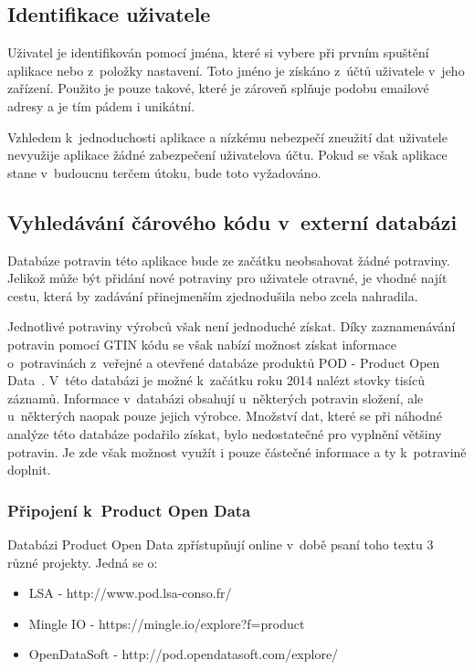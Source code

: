 \documentclass[thesis=B,czech]{FITthesis}[2013/10/20]
\begin{document}
\clearpage

\subsection{Identifikace uživatele}

Uživatel je identifikován pomocí jména, které si vybere při prvním spuštění aplikace nebo z~položky nastavení. Toto jméno je získáno z~účtů uživatele v~jeho zařízení. Použito je pouze takové, které je zároveň splňuje podobu emailové adresy a je tím pádem i unikátní.

Vzhledem k~jednoduchosti aplikace a nízkému nebezpečí zneužití dat uživatele nevyužije aplikace žádné zabezpečení uživatelova účtu. Pokud se však aplikace stane v~budoucnu terčem útoku, bude toto vyžadováno.

\subsection{Vyhledávání čárového kódu v~externí databázi}

Databáze potravin této aplikace bude ze začátku neobsahovat žádné potraviny. Jelikož může být přidání nové potraviny pro uživatele otravné, je vhodné najít cestu, která by zadávání přinejmenším zjednodušila nebo zcela nahradila.

Jednotlivé potraviny výrobců však není jednoduché získat. Díky zaznamenávání potravin pomocí GTIN kódu se však nabízí možnost získat informace o~potravinách z~veřejné a otevřené databáze produktů POD - Product Open Data~\cite{pod}. V~této databázi je možné k~začátku roku 2014 nalézt stovky tisíců záznamů. Informace v~databázi obsahují u~některých potravin složení, ale u~některých naopak pouze jejich výrobce. Množství dat, které se při náhodné analýze této databáze podařilo získat, bylo nedostatečné pro vyplnění většiny potravin. Je zde však možnost využít i pouze částečné informace a ty k~potravině doplnit.

\subsubsection{Připojení k~Product Open Data}

Databázi Product Open Data zpřístupňují online v~době psaní toho textu 3 různé projekty. Jedná se o:
\begin{itemize}
  \item{LSA - http://www.pod.lsa-conso.fr/}
  \item{Mingle IO - https://mingle.io/explore?f=product}
  \item{OpenDataSoft - http://pod.opendatasoft.com/explore/}
\end{itemize}
\end{document}

